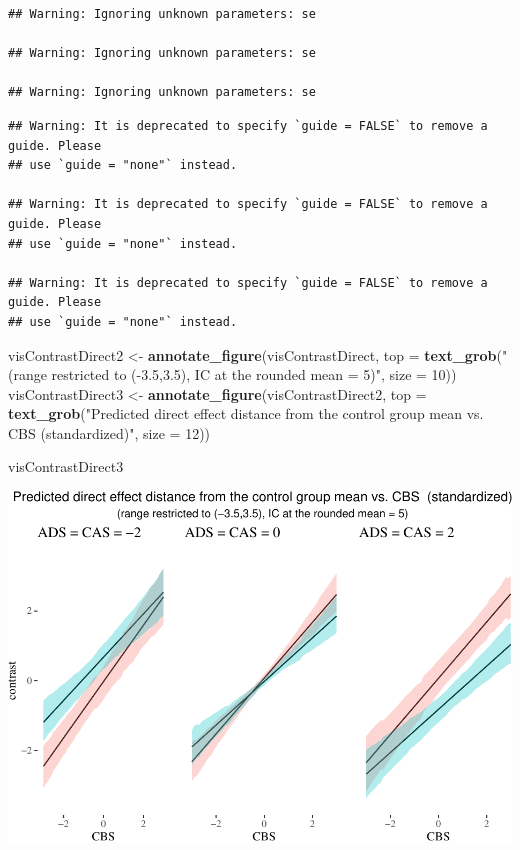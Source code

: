 \documentclass[10pt,dvipsnames,enabledeprecatedfontcommands]{scrartcl}
\newenvironment{Shaded}{\begin{snugshade}}{\end{snugshade}}
\newcommand{\KeywordTok}[1]{\textcolor[rgb]{0.13,0.29,0.53}{\textbf{#1}}}
\newcommand{\DataTypeTok}[1]{\textcolor[rgb]{0.13,0.29,0.53}{#1}}
\newcommand{\DecValTok}[1]{\textcolor[rgb]{0.00,0.00,0.81}{#1}}
\newcommand{\StringTok}[1]{\textcolor[rgb]{0.31,0.60,0.02}{#1}}
\newcommand{\NormalTok}[1]{#1}
\begin{document}
\begin{verbatim}
## Warning: Ignoring unknown parameters: se

## Warning: Ignoring unknown parameters: se

## Warning: Ignoring unknown parameters: se
\end{verbatim}

\begin{verbatim}
## Warning: It is deprecated to specify `guide = FALSE` to remove a guide. Please
## use `guide = "none"` instead.

## Warning: It is deprecated to specify `guide = FALSE` to remove a guide. Please
## use `guide = "none"` instead.

## Warning: It is deprecated to specify `guide = FALSE` to remove a guide. Please
## use `guide = "none"` instead.
\end{verbatim}

\begin{Shaded}
\begin{Highlighting}[]
\NormalTok{visContrastDirect2 <-}\StringTok{ }\KeywordTok{annotate_figure}\NormalTok{(visContrastDirect, }
                                        \DataTypeTok{top =} \KeywordTok{text_grob}\NormalTok{(}\StringTok{"(range restricted to (-3.5,3.5), IC at the rounded mean = 5)"}\NormalTok{,}
                                                        \DataTypeTok{size =} \DecValTok{10}\NormalTok{))}
\NormalTok{visContrastDirect3 <-}\StringTok{ }\KeywordTok{annotate_figure}\NormalTok{(visContrastDirect2, }
                                        \DataTypeTok{top =} \KeywordTok{text_grob}\NormalTok{(}\StringTok{"Predicted direct effect distance from the control group mean vs. CBS  (standardized)"}\NormalTok{,}
                                                        \DataTypeTok{size =} \DecValTok{12}\NormalTok{))}

\NormalTok{visContrastDirect3}
\end{Highlighting}
\end{Shaded}

\begin{center}\includegraphics[width=1\linewidth]{bayesianReport3_files/figure-latex/unnamed-chunk-18-1} \end{center}
\end{document}
